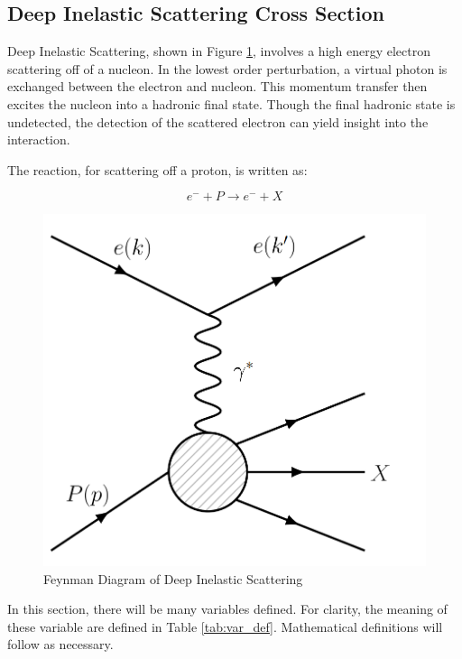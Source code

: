 
\subsection{Deep Inelastic Scattering Cross Section}

Deep Inelastic Scattering, shown in Figure \ref{fig:feyn_dis}, involves a high energy electron scattering off of a nucleon. In the lowest order perturbation, a virtual photon is exchanged between the electron and nucleon. This momentum transfer then excites the nucleon into a hadronic final state. Though the final hadronic state is undetected, the detection of the scattered electron can yield insight into the interaction.

The reaction, for scattering off a proton, is written as:

\begin{equation*}
	e^- + P \rightarrow e^- + X
\end{equation*}

\begin{figure}
\begin{center}
\includegraphics[width=.5\textwidth]{./scattering/fig/feyn_dis.png}
\caption{Feynman Diagram of Deep Inelastic Scattering}
\label{fig:feyn_dis}
\end{center}
\end{figure}

In this section, there will be many variables defined. For clarity, the meaning of these variable are defined in Table \ref{tab:var_def}. Mathematical definitions will follow as necessary.

